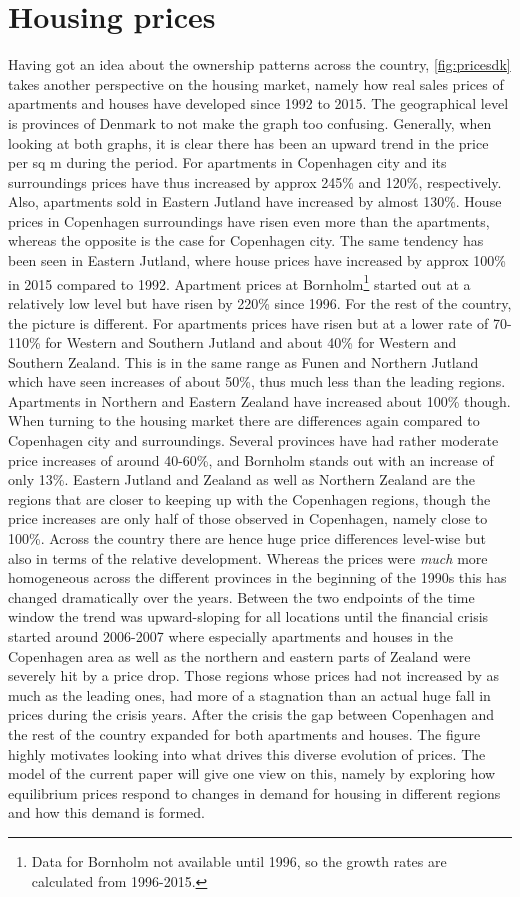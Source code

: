 \section{Housing prices}
Having got an idea about the ownership patterns across the country, \autoref{fig:pricesdk} takes another perspective on the housing market, namely how real sales prices of apartments and houses have developed since 1992 to 2015. The geographical level is provinces of Denmark to not make the graph too confusing. Generally, when looking at both graphs, it is clear there has been an upward trend in the price per sq m during the period. For apartments in Copenhagen city and its surroundings prices have thus increased by approx 245\% and 120\%, respectively. Also, apartments sold in Eastern Jutland have increased by almost 130\%. House prices in Copenhagen surroundings have risen even more than the apartments, whereas the opposite is the case for Copenhagen city. The same tendency has been seen in Eastern Jutland, where house prices have increased by approx 100\% in 2015 compared to 1992. Apartment prices at Bornholm\footnote{Data for Bornholm not available until 1996, so the growth rates are calculated from 1996-2015.} started out at a relatively low level but have risen by 220\% since 1996. For the rest of the country, the picture is different. For apartments prices have risen but at a lower rate of 70-110\% for Western and Southern Jutland and about 40\% for Western and Southern Zealand. This is in the same range as Funen and Northern Jutland which have seen increases of about 50\%, thus much less than the leading regions. Apartments in Northern and Eastern Zealand have increased about 100\% though. When turning to the housing market there are differences again compared to Copenhagen city and surroundings. Several provinces have had rather moderate price increases of around 40-60\%, and Bornholm stands out with an increase of only 13\%. Eastern Jutland and Zealand as well as Northern Zealand are the regions that are closer to keeping up with the Copenhagen regions, though the price increases are only half of those observed in Copenhagen, namely close to 100\%. Across the country there are hence huge price differences level-wise but also in terms of the relative development. Whereas the prices were \textit{much} more homogeneous across the different provinces in the beginning of the 1990s this has changed dramatically over the years. Between the two endpoints of the time window the trend was upward-sloping for all locations until the financial crisis started around 2006-2007 where especially apartments and houses in the Copenhagen area as well as the northern and eastern parts of Zealand were severely hit by a price drop. Those regions whose prices had not increased by as much as the leading ones, had more of a stagnation than an actual huge fall in prices during the crisis years. After the crisis the gap between Copenhagen and the rest of the country expanded for both apartments and houses. The figure highly motivates looking into what drives this diverse evolution of prices. The model of the current paper will give one view on this, namely by exploring how equilibrium prices respond to changes in demand for housing in different regions and how this demand is formed.

